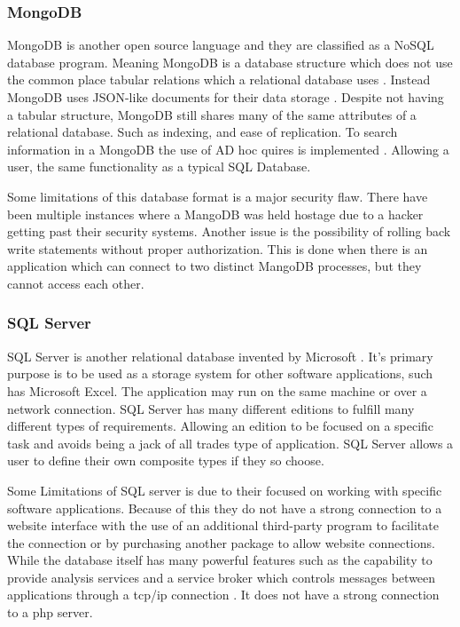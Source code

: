 \documentclass[onecolumn, draftclsnofoot,10pt, compsoc]{IEEEtran}
\begin{document}
\subsubsection{MongoDB}

MongoDB is another open source language and they are classified as a NoSQL database program.
Meaning MongoDB is a database structure which does not use the common place tabular relations which a relational database uses \cite{coderseye}.
Instead MongoDB uses JSON-like documents for their data storage \cite{kerby}.
Despite not having a tabular structure, MongoDB still shares many of the same attributes of a relational database. 
Such as indexing, and ease of replication.
To search information in a MongoDB the use of AD hoc quires is implemented \cite{kerby}.
Allowing a user, the same functionality as a typical SQL Database.

Some limitations of this database format is a major security flaw.
There have been multiple instances where a MangoDB was held hostage due to a hacker getting past their security systems.
Another issue is the possibility of rolling back write statements without proper authorization.
This is done when there is an application which can connect to two distinct MangoDB processes, but they cannot access each other. 

\subsubsection{SQL Server}

SQL Server is another relational database invented by Microsoft .
It’s primary purpose is to be used as a storage system for other software applications, such has Microsoft Excel. 
The application may run on the same machine or over a network connection.
SQL Server has many different editions to fulfill many different types of requirements.
Allowing an edition to be focused on a specific task and avoids being a jack of all trades type of application.
SQL Server allows a user to define their own composite types if they so choose. 

Some Limitations of SQL server is due to their focused on working with specific software applications. Because of this they do not have a strong connection to a website interface with the use of an additional third-party program to facilitate the connection or by purchasing another package to allow website connections.
While the database itself has many powerful features such as the capability to provide analysis services \cite{microsoftMining} and a service broker which controls messages between applications through a tcp/ip connection \cite{microsoftData}.
It does not have a strong connection to a php server. 
\end{document}
